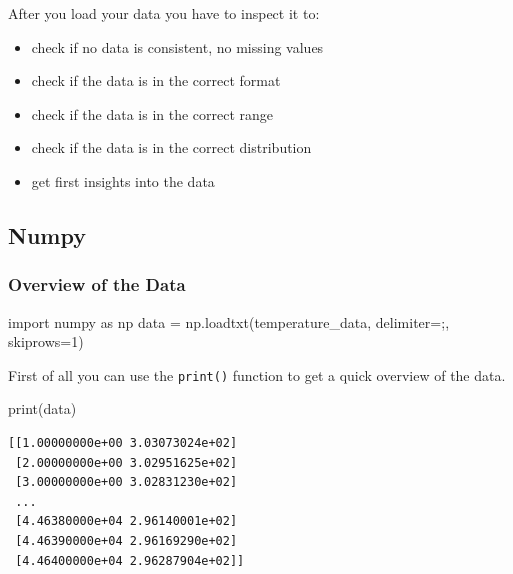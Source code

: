\documentclass[
  letterpaper,
  DIV=11,
  numbers=noendperiod]{scrreprt}
\newenvironment{Shaded}{\begin{snugshade}}{\end{snugshade}}
\newcommand{\BuiltInTok}[1]{\textcolor[rgb]{0.00,0.23,0.31}{#1}}
\newcommand{\DecValTok}[1]{\textcolor[rgb]{0.68,0.00,0.00}{#1}}
\newcommand{\ImportTok}[1]{\textcolor[rgb]{0.00,0.46,0.62}{#1}}
\newcommand{\NormalTok}[1]{\textcolor[rgb]{0.00,0.23,0.31}{#1}}
\newcommand{\OperatorTok}[1]{\textcolor[rgb]{0.37,0.37,0.37}{#1}}
\newcommand{\StringTok}[1]{\textcolor[rgb]{0.13,0.47,0.30}{#1}}
\providecommand{\tightlist}{%
  \setlength{\itemsep}{0pt}\setlength{\parskip}{0pt}}\usepackage{longtable,booktabs,array}
\begin{document}

After you load your data you have to inspect it to:

\begin{itemize}
\tightlist
\item
  check if no data is consistent, no missing values
\item
  check if the data is in the correct format
\item
  check if the data is in the correct range
\item
  check if the data is in the correct distribution
\item
  get first insights into the data
\end{itemize}

\subsection*{Numpy}\label{numpy-3}

\subsubsection*{Overview of the Data}\label{overview-of-the-data}

\begin{Shaded}
\begin{Highlighting}[]
\ImportTok{import}\NormalTok{ numpy }\ImportTok{as}\NormalTok{ np}
\NormalTok{data }\OperatorTok{=}\NormalTok{ np.loadtxt(temperature\_data, delimiter}\OperatorTok{=}\StringTok{\textquotesingle{};\textquotesingle{}}\NormalTok{, skiprows}\OperatorTok{=}\DecValTok{1}\NormalTok{)}
\end{Highlighting}
\end{Shaded}

First of all you can use the \texttt{print()} function to get a quick
overview of the data.

\begin{Shaded}
\begin{Highlighting}[]
\BuiltInTok{print}\NormalTok{(data)}
\end{Highlighting}
\end{Shaded}

\begin{verbatim}
[[1.00000000e+00 3.03073024e+02]
 [2.00000000e+00 3.02951625e+02]
 [3.00000000e+00 3.02831230e+02]
 ...
 [4.46380000e+04 2.96140001e+02]
 [4.46390000e+04 2.96169290e+02]
 [4.46400000e+04 2.96287904e+02]]
\end{verbatim}
\end{document}
